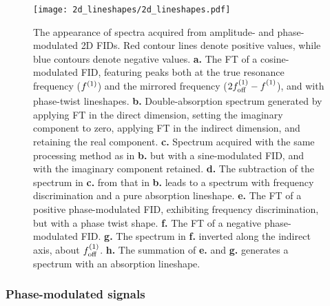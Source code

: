 \begin{figure}
    \centering
    \texttt{[image: 2d\_lineshapes/2d\_lineshapes.pdf]}
    \caption[
        The appearence of spectra produced from amplitude- and phase-modulated
        \acs{2D} \acs{FID}s.
    ]{
        The appearance of spectra acquired from amplitude- and phase- modulated
        \acs{2D} \acs{FID}s.
        Red contour lines denote positive values, while blue contours denote
        negative values.
        \textbf{a.} The \ac{FT} of a cosine-modulated \ac{FID}, featuring peaks
        both at the true resonance frequency ($f^{(1)}$) and the mirrored
        frequency ($2f_{\mathrm{off}}^{(1)} - f^{(1)}_{\vphantom{off}}$), and with phase-twist lineshapes.
        \textbf{b.} Double-absorption spectrum generated by applying \ac{FT}
        in the direct dimension, setting the imaginary component to zero,
        applying \ac{FT} in the indirect dimension, and retaining the real
        component.
        \textbf{c.} Spectrum acquired with the same processing method as in
        \textbf{b.} but with a sine-modulated \ac{FID}, and with the imaginary
        component retained.
        \textbf{d.} The subtraction of the spectrum in \textbf{c.} from that in
        \textbf{b.} leads to a spectrum with frequency discrimination and a
        pure absorption lineshape.
        \textbf{e.} The \ac{FT} of a positive phase-modulated \ac{FID},
        exhibiting frequency discrimination, but with a phase twist shape.
        \textbf{f.} The \ac{FT} of a negative phase-modulated \ac{FID}.
        \textbf{g.} The spectrum in \textbf{f.} inverted along the indirect
        axis, about $f_{\mathrm{off}}^{(1)}$.
        \textbf{h.} The summation of \textbf{e.} and \textbf{g.} generates a
        spectrum with an absorption lineshape.
    }
    \label{fig:2d-lineshapes}
\end{figure}

\subsubsection{Phase-modulated signals}

